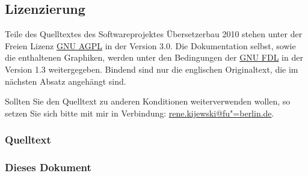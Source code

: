\documentclass[10pt,a4paper,ngerman,titlepage,tocindentauto]{scrartcl}
\begin{document}
		\subsection{Lizenzierung}
			Teile des Quelltextes des Softwareprojektes Übersetzerbau 2010 stehen unter der Freien
			Lizenz \href{http://www.gnu.org/licenses/agpl-3.0.html}{GNU AGPL} in der Version 3.0.
			Die Dokumentation selbst, sowie die enthaltenen Graphiken, werden unter den Bedingungen
			der \href{http://www.gnu.org/licenses/fdl-1.3.html}{GNU FDL} in der Version 1.3 weitergegeben.
			Bindend sind nur die englischen Originaltext, die im nächsten Absatz angehängt sind.
			
			Sollten Sie den Quelltext zu anderen Konditionen weiterverwenden wollen, so setzen Sie
			sich bitte mit mir in Verbindung:
			\href{mailto:rene.kijewski@fu-berlin.de?subject=[SWP_CP_2010]}{rene.kijewski@fu"=berlin.de}.
			
			\subsubsection{Quelltext}
				\begin{multicols}{3}
					{\tiny}
				\end{multicols}
			
			\subsubsection[Dieses Dokument]{Dieses Dokument}
				\begin{multicols}{3}
					{\tiny}
				\end{multicols}
\end{document}
